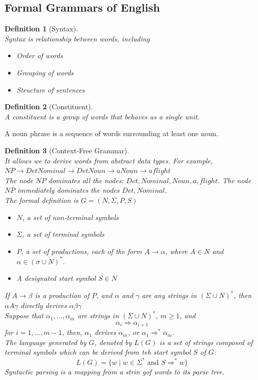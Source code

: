 \documentclass[12pt]{article}
\newtheorem{definition}{Definition}[section]
\theoremstyle{definition}
\begin{document}
\subsection{Formal Grammars of English}
\begin{definition}[Syntax]
\hfill\\\normalfont Syntax is relationship between words, including
\begin{itemize}
	\item Order of words
	\item Grouping of words
	\item Structure of sentences
\end{itemize}
\end{definition}
\begin{definition}[Constituent]
\hfill\\\normalfont A constituent is  a group of words that behaves as a single unit.
\end{definition}
A noun phrase is a sequence of words surrounding at least one noun.\\
\begin{definition}[Context-Free Grammar]
\hfill\\\normalfont 
It allows we to derive words from abstract data types. For example,
$NP\to Det Nominal \to Det Noun \to a Noun \to a flight$\\
The node $NP$ dominates all the nodes: $Det, Nominal, Noun, a, flight$.
The node $NP$ immediately dominates the nodes $Det, Nominal$.\\

The formal definition is $G=(N, \Sigma, P, S)$
\begin{itemize}
	\item $N$, a set of non-terminal symbols
	\item $\Sigma$, a set of terminal symbols
	\item $P$, a set of productions, each of the form $A\to \alpha$, where $A\in N$ and $\alpha \in (\sigma \cup N)^\ast$.
	\item A designated start symbol $S\in N$
\end{itemize}
If $A\to \beta$ is a production of $P$, and $\alpha$ and $\gamma$ are any strings in $(\Sigma\cup N)^\ast$, then $\alpha A\gamma$ directly derives $\alpha\beta\gamma$\\
Suppose that $\alpha_1,\ldots, \alpha_m$ are strings in $(\Sigma\cup N)^\ast$, $m\geq 1$, and
\[
\alpha_i\Rightarrow \alpha_{i+1}
\]
for $i= 1, \ldots, m-1$, then, $\alpha_1$ derives $\alpha_m$, or $\alpha_1\Rightarrow^\ast \alpha_m$.\\
The language generated by $G$, denoted by $L(G)$ is a set of strings composed of terminal symbols which can be derived from teh start symbol $S$ of $G$:
\[
L(G)=\{w\mid w\in \Sigma^\ast \text{ and } S\Rightarrow^\ast w\}
\]
Syntactic parsing is a mapping from a strin gof words to its parse tree.
\end{definition}
\end{document}
